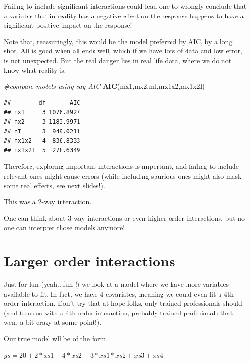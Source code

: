 \documentclass[
]{book}
\newenvironment{Shaded}{\begin{snugshade}}{\end{snugshade}}
\newcommand{\CommentTok}[1]{\textcolor[rgb]{0.56,0.35,0.01}{\textit{#1}}}
\newcommand{\KeywordTok}[1]{\textcolor[rgb]{0.13,0.29,0.53}{\textbf{#1}}}
\newcommand{\NormalTok}[1]{#1}
\begin{document}
Failing to include significant interactions could lead one to wrongly conclude that a variable that in reality has a negative effect on the response happens to have a significant positive impact on the response!

Note that, reassuringly, this would be the model preferred by AIC, by a long shot. All is good when all ends well, which if we have lots of data and low error, is not unexpected. But the real danger lies in real life data, where we do not know what reality is.

\begin{Shaded}
\begin{Highlighting}[]
\CommentTok{#compare models using say AIC}
\KeywordTok{AIC}\NormalTok{(mx1,mx2,mI,mx1x2,mx1x2I)}
\end{Highlighting}
\end{Shaded}

\begin{verbatim}
##        df       AIC
## mx1     3 1076.8927
## mx2     3 1183.9971
## mI      3  949.0211
## mx1x2   4  836.8333
## mx1x2I  5  278.6349
\end{verbatim}

Therefore, exploring important interactions is important, and failing to include relevant ones might cause errors (while including spurious ones might also mask some real effects, see next slides!).

This was a 2-way interaction.

One can think about 3-way interactions or even higher order interactions, but no one can interpret those models anymore!

\hypertarget{larger-order-interactions}{%
\section{Larger order interactions}\label{larger-order-interactions}}

Just for fun (yeah.. fun !) we look at a model where we have more variables available to fit. In fact, we have 4 covariates, meaning we could even fit a 4th order interaction. Don't try that at hope folks, only trained professionals should (and to so so with a 4th order interaction, probably trained profesionals that went a bit crazy at some point!).

Our true model wll be of the form

\(ys=20+2*xs1-4*xs2+3*xs1*xs2+xs3+xs4\)
\end{document}
